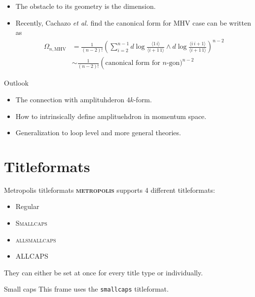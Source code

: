 \documentclass[10pt]{beamer}
\newcommand{\themename}{\textbf{\textsc{metropolis}}\xspace}
\begin{document}
\begin{frame}
\begin{itemize}[<+->]
  \item The obstacle to its geometry is the dimension.
  \item Recently, Cachazo \emph{et al.} find the canonical form for MHV case can be written as
  \begin{align*}
    \Omega_{n,\text{MHV}}&=\frac{1}{(n-2)!} \left(\sum_{i=2}^{n-1} d\log \frac{\langle1\,i\rangle}{\langle i+1\, 1\rangle}\wedge d\log \frac{\langle i\, i+1\rangle}{\langle i+1\, 1\rangle}\right)^{n-2} \\
    &\sim \frac{1}{(n-2)!} \left(\text{canonical form for $n$-gon})^{n-2}
  \end{align*}  
\end{itemize}
\end{frame}


\begin{frame}{Outlook}
  \begin{itemize}
    \item The connection with amplituhderon $4k$-form.
    \item How to intrinsically define amplituehdron in momentum space.
    \item Generalization to loop level and more general theories. 
  \end{itemize}  
\end{frame}

\iffalse
\section{Titleformats}

\begin{frame}{Metropolis titleformats}
	\themename supports 4 different titleformats:
	\begin{itemize}
		\item Regular
		\item \textsc{Smallcaps}
		\item \textsc{allsmallcaps}
		\item ALLCAPS
	\end{itemize}
	They can either be set at once for every title type or individually.
\end{frame}

{
\begin{frame}{Small caps}
	This frame uses the \texttt{smallcaps} titleformat.


\end{frame}
}
\end{document}
